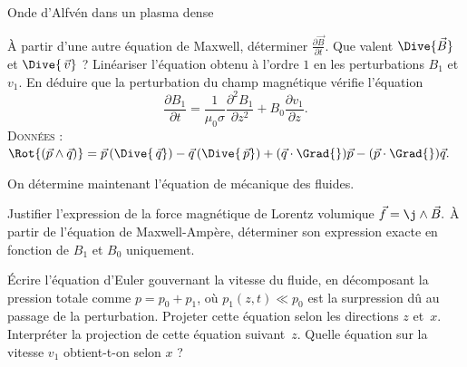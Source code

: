 \begin{exo}[PC][3][colle]{Onde d'Alfvén dans un plasma dense}
\begin{quest}
        \item À partir d'une autre équation de Maxwell, déterminer $\frac{\partial \Vec{B}}{\partial t}$. Que valent $\Dive{\Vec{B}}$ et $\Dive{\,\Vec{v}}$ ? Linéariser l'équation obtenu à l'ordre $1$ en les perturbations $B_1$ et $v_1$. En déduire que la perturbation du champ magnétique vérifie l'équation
        \begin{equation}
        \dfrac{\partial B_1}{\partial t} = \dfrac{1}{\mu_0 \sigma} \dfrac{\partial^2 B_1}{\partial z^2} + B_0 \dfrac{\partial v_1}{\partial z}.
        \end{equation}
\textsc{Données} :   $
\Rot{(\Vec{p}\wedge\Vec{q})} =  \Vec{p} \,(\Dive{\,\Vec{q}})- \Vec{q}\, (\Dive{\,\Vec{p}}) + (\Vec{q}\cdot \Grad{}) \Vec{p} - (\Vec{p}\cdot \Grad{}) \Vec{q}.
$
\end{quest}
On détermine maintenant l'équation de mécanique des fluides.
\begin{quest}
           \item Justifier l'expression de la force magnétique de Lorentz volumique
            $
           \Vec{f} = \j \wedge \Vec{B}.
           $
           À partir de l'équation de Maxwell-Ampère, déterminer son expression exacte en fonction de $B_1$ et $B_0$ uniquement.


           \item Écrire l'équation d'Euler gouvernant la vitesse du fluide, en décomposant la pression totale comme $p=p_0 + p_1$, où $p_1(z,t) \ll p_0$ est la surpression dû au passage de la perturbation. Projeter cette équation selon les directions $z$ et~$x$. Interpréter la projection de cette équation suivant~$z$. Quelle équation sur la vitesse $v_1$ obtient-t-on selon $x$ ?


\end{quest}
\end{exo}

